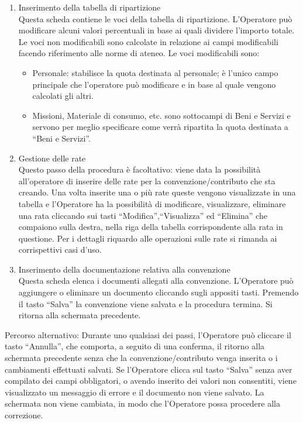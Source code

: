 \begin{enumerate}
\begin{enumerate}
    \item Inserimento della tabella di ripartizione\\
     
      Questa scheda contiene le voci della tabella di ripartizione. L'Operatore può modificare alcuni valori percentuali 
      in base ai quali dividere l'importo totale. Le voci non modificabili sono calcolate in relazione ai campi modificabili facendo riferimento alle norme di ateneo. Le voci modificabili sono:
      \begin{itemize}
	\item Personale: stabilisce la quota destinata al personale; è l'unico campo principale che l'operatore può modificare e in base al quale vengono calcolati gli altri.
	\item Missioni, Materiale di consumo, etc. sono sottocampi di Beni e Servizi e servono per meglio specificare come verrà ripartita la quota destinata a ``Beni e Servizi''.
      \end{itemize}
    \item Gestione delle rate\\
      
      Questo passo della procedura è facoltativo: viene data la possibilità all'operatore di inserire delle rate per la convenzione/contributo
      che sta creando. Una volta inserite una o più rate
      queste vengono visualizzate in una tabella e l'Operatore
      ha la possibilità di modificare, visualizzare, eliminare una rata cliccando sui tasti ``Modifica'',``Visualizza'' ed ``Elimina'' che compaiono sulla destra, nella riga della tabella
       corrispondente alla rata in questione. Per i dettagli riquardo alle operazioni sulle rate si rimanda ai corrispettivi casi d'uso.

      
    \item Inserimento della documentazione relativa alla convenzione\\
	  
	  Questa scheda elenca i documenti allegati alla convenzione. L'Operatore può aggiungere o eliminare un documento 
	  cliccando sugli appositi tasti. Premendo il tasto ``Salva'' la convenzione viene salvata e la procedura termina. Si ritorna alla schermata precedente.
  \end{enumerate}
		 
  Percorso alternativo:
  Durante uno qualsiasi dei passi, l'Operatore può cliccare il tasto ``Annulla'', che comporta, a seguito di una conferma, il ritorno alla schermata precedente
  senza che la convenzione/contributo venga inserita o i cambiamenti effettuati salvati.
  Se l'Operatore clicca sul tasto ``Salva'' senza aver compilato dei campi obbligatori, o avendo inserito dei valori non consentiti, viene visualizzato un messaggio di errore 
  e il documento non viene salvato. La schermata non viene cambiata, in modo che l'Operatore possa procedere alla correzione.
     

\end{enumerate}
